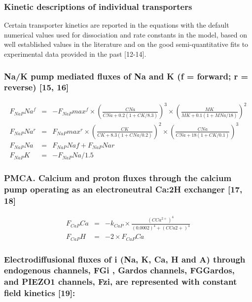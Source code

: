 \documentclass[a4paper]{article}
\newcommand{\med}[1]{M#1}
\newcommand{\cell}[1]{C#1}
\newcommand{\MNa}{\med{Na}}
\newcommand{\MK}{\med{K}}
\newcommand{\CNa}{\cell{Na}}
\newcommand{\CK}{\cell{K}}
\newcommand{\CCatp}{\cell{Ca^{2+}}}
\newcommand{\CCa}{\cell{Ca}}
\newcommand{\F}[2]{F_{#1}#2}
\newcommand{\kk}[2]{k_{#1}#2}
\begin{document}
\subsubsection{Kinetic descriptions of individual transporters}
Certain transporter kinetics are reported in the equations with the default numerical values used for dissociation and rate constants in the model, based on well established values in the literature and on the good semi-quantitative fits to experimental data provided in the past [12-14].  

\setcounter{equation}{0}
\renewcommand{\theequation}{11.\alph{equation}}


\subsubsection{Na/K pump mediated fluxes of Na and K (f = forward; r = reverse) [15, 16]}

\begin{eqnarray}
\F{NaP}{Na}^f  &=& -\F{NaP}{max}^f\times\left(\frac{\CNa}{\CNa + 0.2(1 + \CK/8.3)}\right)^3 \times\left(\frac{\MK}{\MK + 0.1(1 + \MNa/18)}\right)^2 \\
\F{NaP}{Na}^r  &=& \F{NaP}{max}^r\times\left(\frac{\CK}{\CK + 8.3(1 + \CNa/0.2)}\right)^2\times\left(\frac{\CNa}{\CNa + 18(1 + \CK/0.1)}\right)^3 \\
\F{NaP}{Na} &=& \F{NaP}{Naf} + \F{NaP}{Nar} \\
\F{NaP}{K} &=& -\F{NaP}{Na}/1.5
\end{eqnarray}

\subsubsection{PMCA. Calcium and proton fluxes through the calcium pump operating as an electroneutral Ca:2H exchanger  [17, 18]}

\setcounter{equation}{0}
\renewcommand{\theequation}{12.\alph{equation}}

\begin{eqnarray}
\F{CaP}{Ca} &=& -\kk{CaP}{}\times\frac{(\CCatp)^4}{(0.0002)^4 + (\CCa2+)^4}\\
\F{CaP}{H} &=& -2\times\F{CaP}{Ca}
\end{eqnarray}

\subsubsection{Electrodiffusional fluxes of i (Na, K, Ca, H and A) through endogenous channels, FGi , Gardos channels, FGGardos, and PIEZO1 channels, Fzi, are represented with constant field kinetics [19]: }
\end{document}
